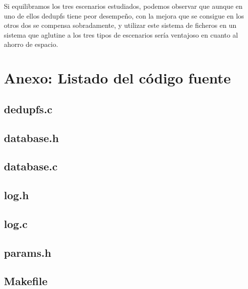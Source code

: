 \documentclass[12pt,a4paper]{article}
\begin{document}
Si equilibramos los tres escenarios estudiados, podemos observar que aunque en uno de ellos dedupfs tiene peor desempeño, con la mejora que se consigue en los otros dos se compensa sobradamente, y utilizar este sistema de ficheros en un sistema que aglutine a los tres tipos de escenarios sería ventajoso en cuanto al ahorro de espacio.



\newpage
\section{Anexo: Listado del código fuente}

\subsection{dedupfs.c}

\subsection{database.h}

\subsection{database.c}

\subsection{log.h}

\subsection{log.c}

\subsection{params.h}

\subsection{Makefile}
\end{document}
